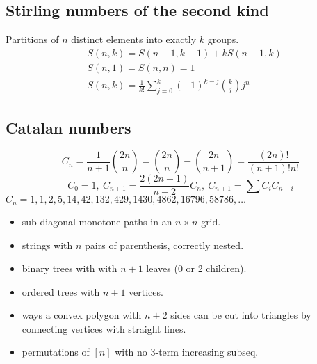 \subsection{Stirling numbers of the second kind} %
Partitions of $n$ distinct elements into exactly $k$ groups.
\begin{align*}
& S(n, k) = S(n - 1, k - 1) + k S(n - 1,k) \\
& S(n, 1) = S(n, n) = 1 \\
& S(n, k) = \frac{1}{k!}\sum_{j = 0}^k (-1)^{k - j}\binom{k}{j}j^n
\end{align*}

\subsection{Catalan numbers} %
\[ C_n=\frac{1}{n+1}\binom{2n}{n}= \binom{2n}{n}-\binom{2n}{n+1} = \frac{(2n)!}{(n+1)!n!} \]
\[ C_0=1,\ C_{n+1} = \frac{2(2n+1)}{n+2}C_n,\ C_{n+1}=\sum C_iC_{n-i} \]
${C_n = 1, 1, 2, 5, 14, 42, 132, 429, 1430, 4862, 16796, 58786, \dots}$
\begin{itemize}[noitemsep]
	\item sub-diagonal monotone paths in an $n\times n$ grid.
	\item strings with $n$ pairs of parenthesis, correctly nested.
	\item binary trees with with $n+1$ leaves (0 or 2 children).
	\item ordered trees with $n+1$ vertices.
	\item ways a convex polygon with $n+2$ sides can be cut into triangles by connecting vertices with straight lines.
	\item permutations of $[n]$ with no 3-term increasing subseq.
\end{itemize}

